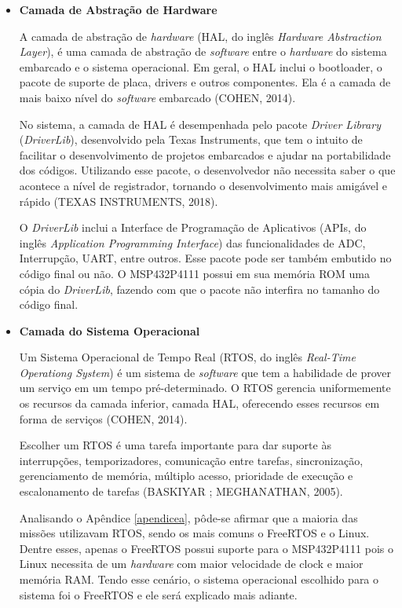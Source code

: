 \begin{itemize}
\item \textbf{Camada de Abstração de Hardware} 

A camada de abstração de \textit{hardware} (HAL, do inglês \textit{Hardware Abstraction Layer}), é uma camada de abstração de \textit{software} entre o \textit{hardware} do sistema embarcado e o sistema operacional. Em geral, o HAL inclui o bootloader, o pacote de suporte de placa, drivers e outros componentes. Ela é a camada de mais baixo nível do \textit{software} embarcado (COHEN, 2014).

No sistema, a camada de HAL é desempenhada pelo pacote \textit{Driver Library} (\textit{DriverLib}), desenvolvido pela Texas Instruments, que tem o intuito de facilitar o desenvolvimento de projetos embarcados e ajudar na portabilidade dos códigos. Utilizando esse pacote, o desenvolvedor não necessita saber o que acontece a nível de registrador, tornando o desenvolvimento mais amigável e rápido  (TEXAS INSTRUMENTS, 2018).

O \textit{DriverLib} inclui a Interface de Programação de Aplicativos (APIs, do inglês \textit{Application Programming Interface}) das funcionalidades de ADC, Interrupção, UART, entre outros. Esse pacote pode ser também embutido no código final ou não. O MSP432P4111 possui em sua memória ROM uma cópia do \textit{DriverLib}, fazendo com que o pacote não interfira no tamanho do código final.

\item \textbf{Camada do Sistema Operacional}

Um Sistema Operacional de Tempo Real (RTOS, do inglês \textit{Real-Time Operationg System}) é um sistema de \textit{software} que tem a habilidade de prover um serviço em um tempo pré-determinado. O RTOS gerencia uniformemente os recursos da camada inferior, camada HAL, oferecendo esses recursos em forma de serviços (COHEN, 2014).

Escolher um RTOS é uma tarefa importante para dar suporte às interrupções, temporizadores, comunicação entre tarefas, sincronização, gerenciamento de memória, múltiplo acesso, prioridade de execução e escalonamento de tarefas (BASKIYAR ; MEGHANATHAN, 2005).

Analisando o Apêndice \ref{apendicea}, pôde-se afirmar que a maioria das missões utilizavam RTOS, sendo os mais comuns o FreeRTOS e o Linux. Dentre esses, apenas o FreeRTOS possui suporte para o MSP432P4111 pois o Linux necessita de um \textit{hardware} com maior velocidade de clock e maior memória RAM. Tendo esse cenário, o sistema operacional escolhido para o sistema foi o FreeRTOS e ele será explicado mais adiante. 


\end{itemize}
